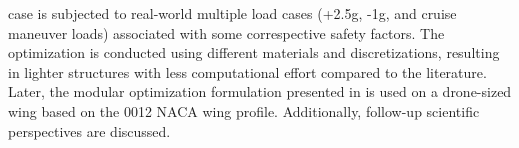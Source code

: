 case is subjected to real-world multiple load cases (+2.5g, -1g, and cruise maneuver loads) associated with some correspective safety factors. The optimization is conducted using different materials and discretizations, resulting in lighter structures with less computational effort compared to the literature. Later, the modular optimization formulation presented in  is used on a drone-sized wing based on the 0012 NACA wing profile. Additionally, follow-up scientific perspectives are discussed.